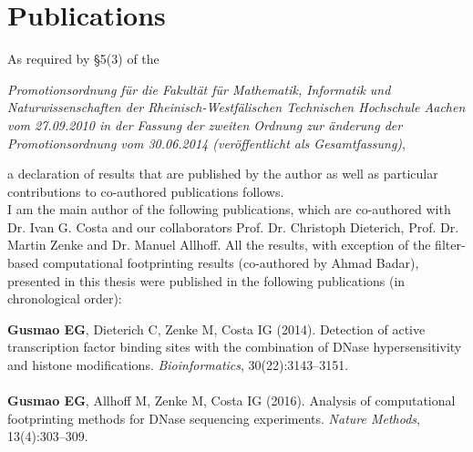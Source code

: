 \chapter*{Publications}
As required by \S 5(3) of the \\

\begin{addmargin}{0.05\textwidth}
\textit{Promotionsordnung f\"ur die Fakult\"at f\"ur Mathematik, Informatik und Naturwissenschaften der Rheinisch-Westf\"alischen Technischen Hochschule Aachen vom 27.09.2010 in der \linebreak Fassung der zweiten Ordnung zur \"anderung der Promotionsordnung vom 30.06.2014 \linebreak (ver\"offentlicht als Gesamtfassung)},
\end{addmargin} 
\vspace{0.5cm}

\noindent
a declaration of results that are published by the author as well as particular contributions to co-authored publications follows. \\

I am the main author of the following publications, which are co-authored with Dr. Ivan G. Costa and our collaborators Prof. Dr. Christoph Dieterich, Prof. Dr. Martin Zenke and Dr. Manuel Allhoff. All the results, with exception of the filter-based computational footprinting results (co-authored by Ahmad Badar), presented in this thesis were published in the following publications (in chronological order):
\\
\begin{addmargin}{0.05\textwidth}
\noindent
\textbf{Gusmao EG}, Dieterich C, Zenke M, Costa IG (2014). Detection of active transcription factor binding sites with the combination of DNase hypersensitivity and histone modifications. \textit{Bioinformatics}, 30(22):3143--3151.\\ \\
\noindent
\textbf{Gusmao EG}, Allhoff M, Zenke M, Costa IG (2016). Analysis of computational footprinting methods for DNase sequencing experiments. \textit{Nature Methods}, 13(4):303--309.\\
\end{addmargin} 


